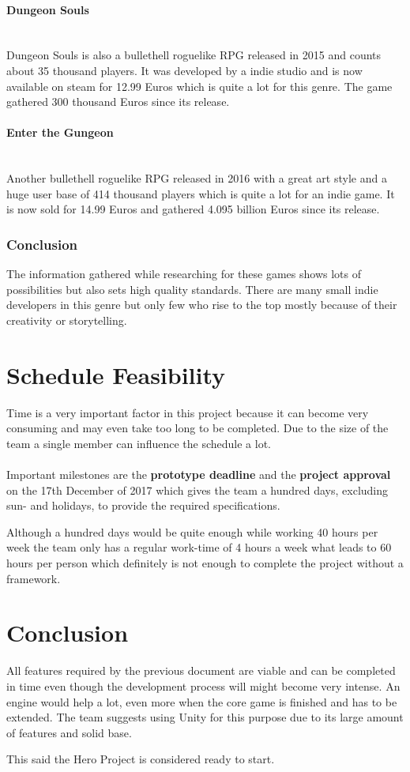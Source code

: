 \documentclass[11pt]{article}
\begin{document}
\paragraph{Dungeon Souls}~\\
Dungeon Souls is also a bullethell roguelike RPG released in 2015 and counts about 35 thousand players. It was developed by a indie studio and is now available on steam for 12.99 Euros which is quite a lot for this genre. 
The game gathered 300 thousand Euros since its release.

\paragraph{Enter the Gungeon}~\\
Another bullethell roguelike RPG released in 2016 with a great art style and a huge user base of 414 thousand players which is quite a lot for an indie game. 
It is now sold for 14.99 Euros and gathered 4.095 billion Euros since its release.

\subsubsection{Conclusion}
The information gathered while researching for these games shows lots of possibilities but also sets high quality standards. 
There are many small indie developers in this genre but only few who rise to the top mostly because of their creativity or storytelling.

\section{Schedule Feasibility}
Time is a very important factor in this project because it can become very consuming and may even take too long to be completed.
Due to the size of the team a single member can influence the schedule a lot.
\\
\\
Important milestones are the \textbf{prototype deadline} and the \textbf{project approval} on the 17th December of 2017 which gives the team a hundred days, excluding sun- and holidays, to provide the required specifications.

Although a hundred days would be quite enough while working 40 hours per week the team only has a regular work-time of 4 hours a week what leads to 60 hours per person which definitely is not enough to complete the project without a framework.

\section{Conclusion}
All features required by the previous document are viable and can be completed in time even though the development process will might become very intense.
An engine would help a lot, even more when the core game is finished and has to be extended. The team suggests using Unity for this purpose due to its large amount of features and solid base.

This said the Hero Project is considered ready to start.
\end{document}

